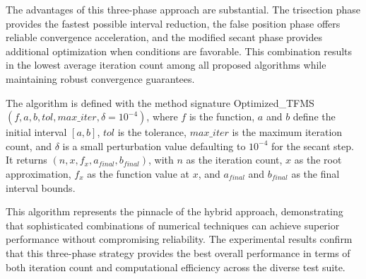 \documentclass[amsmath, amssymb, aps]{revtex4-2}
\begin{document}
The advantages of this three-phase approach are substantial. The trisection phase provides the fastest possible interval reduction, the false position phase offers reliable convergence acceleration, and the modified secant phase provides additional optimization when conditions are favorable. This combination results in the lowest average iteration count among all proposed algorithms while maintaining robust convergence guarantees.

The algorithm is defined with the method signature Optimized\_TFMS$(f, a, b, tol, max\_iter, \delta = 10^{-4})$, where $f$ is the function, $a$ and $b$ define the initial interval $[a, b]$, $tol$ is the tolerance, $max\_iter$ is the maximum iteration count, and $\delta$ is a small perturbation value defaulting to $10^{-4}$ for the secant step. It returns $(n, x, f_x, a_{final}, b_{final})$, with $n$ as the iteration count, $x$ as the root approximation, $f_x$ as the function value at $x$, and $a_{final}$ and $b_{final}$ as the final interval bounds.

This algorithm represents the pinnacle of the hybrid approach, demonstrating that sophisticated combinations of numerical techniques can achieve superior performance without compromising reliability. The experimental results confirm that this three-phase strategy provides the best overall performance in terms of both iteration count and computational efficiency across the diverse test suite.
\end{document}
